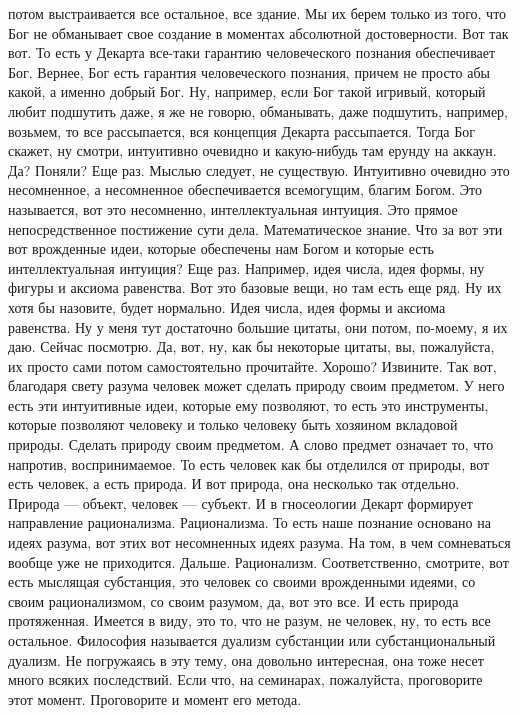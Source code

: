 потом выстраивается все остальное, все здание. Мы их берем только из того, что
Бог не обманывает свое создание в моментах абсолютной достоверности. Вот так
вот. То есть у Декарта все-таки гарантию человеческого познания обеспечивает
Бог. Вернее, Бог есть гарантия человеческого познания, причем не просто абы
какой, а именно добрый Бог. Ну, например, если Бог такой игривый, который любит
подшутить даже, я же не говорю, обманывать, даже подшутить, например, возьмем,
то все рассыпается, вся концепция Декарта рассыпается. Тогда Бог скажет, ну
смотри, интуитивно очевидно и какую-нибудь там ерунду на аккаун. Да? Поняли? Еще
раз. Мыслью следует, не существую. Интуитивно очевидно это несомненное, а
несомненное обеспечивается всемогущим, благим Богом. Это называется, вот это
несомненно, интеллектуальная интуиция. Это прямое непосредственное постижение
сути дела. Математическое знание. Что за вот эти вот врожденные идеи, которые
обеспечены нам Богом и которые есть интеллектуальная интуиция? Еще раз.
Например, идея числа, идея формы, ну фигуры и аксиома равенства. Вот это базовые
вещи, но там есть еще ряд. Ну их хотя бы назовите, будет нормально. Идея числа,
идея формы и аксиома равенства. Ну у меня тут достаточно большие цитаты, они
потом, по-моему, я их даю. Сейчас посмотрю. Да, вот, ну, как бы некоторые
цитаты, вы, пожалуйста, их просто сами потом самостоятельно прочитайте. Хорошо?
Извините. Так вот, благодаря свету разума человек может сделать природу своим
предметом. У него есть эти интуитивные идеи, которые ему позволяют, то есть это
инструменты, которые позволяют человеку и только человеку быть хозяином
вкладовой природы. Сделать природу своим предметом. А слово предмет означает то,
что напротив, воспринимаемое. То есть человек как бы отделился от природы, вот
есть человек, а есть природа. И вот природа, она несколько так отдельно. Природа
— объект, человек — субъект. И в гносеологии Декарт формирует направление
рационализма. Рационализма. То есть наше познание основано на идеях разума, вот
этих вот несомненных идеях разума. На том, в чем сомневаться вообще уже не
приходится. Дальше. Рационализм. Соответственно, смотрите, вот есть мыслящая
субстанция, это человек со своими врожденными идеями, со своим рационализмом, со
своим разумом, да, вот это все. И есть природа протяженная. Имеется в виду, это
то, что не разум, не человек, ну, то есть все остальное. Философия называется
дуализм субстанции или субстанциональный дуализм. Не погружаясь в эту тему, она
довольно интересная, она тоже несет много всяких последствий. Если что, на
семинарах, пожалуйста, проговорите этот момент. Проговорите и момент его метода.
